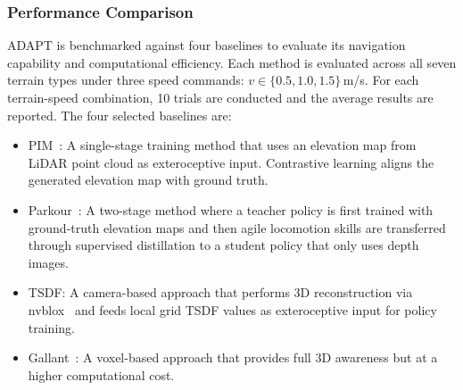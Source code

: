 \documentclass[letterpaper, 10 pt, conference]{ieeeconf/ieeeconf}
\begin{document}
\subsubsection{Performance Comparison}
ADAPT is benchmarked against four baselines to evaluate its navigation capability and computational efficiency.
Each method is evaluated across all seven terrain types under three speed commands: $v \in \{0.5, 1.0, 1.5\}$\,m/s.
For each terrain-speed combination, 10 trials are conducted and the average results are reported.
The four selected baselines are:
\begin{itemize}
    \item PIM~\cite{long2025learning}: A single-stage training method that uses an elevation map from LiDAR point cloud as exteroceptive input. Contrastive learning aligns the generated elevation map with ground truth.
    \item Parkour~\cite{zhuang2024humanoid}: A two-stage method where a teacher policy is first trained with ground-truth elevation maps and then agile locomotion skills are transferred through supervised distillation to a student policy that only uses depth images.
    \item TSDF: A camera-based approach that performs 3D reconstruction via nvblox~\cite{nvblox_2023_GPUAcceleratedSDFMapping} and feeds local grid TSDF values as exteroceptive input for policy training.
    \item Gallant~\cite{Ben_2025_Gallant}: A voxel-based approach that provides full 3D awareness but at a higher computational cost.
\end{itemize}
\end{document}
